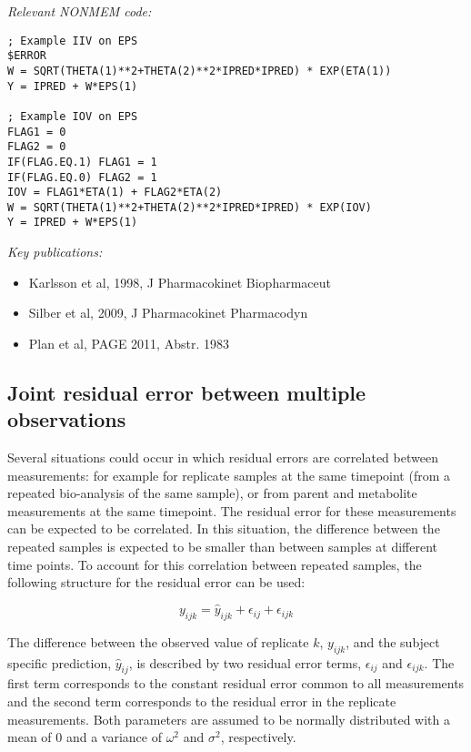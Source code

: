 \documentclass[a4paper,11pt]{article}
\begin{document}
\vspace{10pt}

\noindent \emph{Relevant NONMEM code:}
\begin{lstlisting}
; Example IIV on EPS
$ERROR
W = SQRT(THETA(1)**2+THETA(2)**2*IPRED*IPRED) * EXP(ETA(1))
Y = IPRED + W*EPS(1)

; Example IOV on EPS
FLAG1 = 0
FLAG2 = 0
IF(FLAG.EQ.1) FLAG1 = 1
IF(FLAG.EQ.0) FLAG2 = 1
IOV = FLAG1*ETA(1) + FLAG2*ETA(2)
W = SQRT(THETA(1)**2+THETA(2)**2*IPRED*IPRED) * EXP(IOV)
Y = IPRED + W*EPS(1)
\end{lstlisting}

\noindent \emph{Key publications:}
\begin{itemize}
\item Karlsson et al, 1998, J Pharmacokinet Biopharmaceut
\item Silber et al, 2009, J Pharmacokinet Pharmacodyn
\item Plan et al, PAGE 2011, Abstr. 1983
\end{itemize}

\subsection{Joint residual error between multiple observations}
Several situations could occur in which residual errors are correlated between measurements: for example for replicate samples at the same timepoint (from a repeated bio-analysis of the same sample), or from parent and metabolite measurements at the same timepoint. The residual error for these measurements can be expected to be correlated. In this situation, the difference between the repeated samples is expected to be smaller than between samples at different time points. To account for this correlation between repeated samples, the following structure for the residual error can be used:

\begin{equation}
y_{ijk} = \hat{y}_{ijk} + \epsilon_{ij} + \epsilon_{ijk}
\end{equation}

The difference between the observed value of replicate $k$, $y_{ijk}$,
and the subject specific prediction, $\hat{y}_{ij}$, is described by
two residual error terms, $\epsilon_{ij}$ and $\epsilon_{ijk}$. The
first term corresponds to the constant residual error common to all
measurements and the second term corresponds to the residual error in
the replicate measurements. Both parameters are assumed to be normally
distributed with a mean of 0 and a variance of $\omega^2$ and $\sigma^2$,
respectively.
\end{document}
